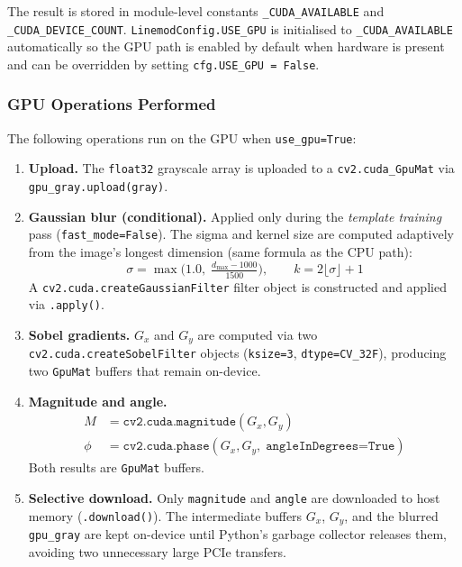 \documentclass[12pt,a4paper]{article}
\begin{document}
The result is stored in module-level constants \texttt{\_CUDA\_AVAILABLE} and
\texttt{\_CUDA\_DEVICE\_COUNT}.  \texttt{LinemodConfig.USE\_GPU} is initialised to
\texttt{\_CUDA\_AVAILABLE} automatically so the GPU path is enabled by default
when hardware is present and can be overridden by setting \texttt{cfg.USE\_GPU = False}.

\subsubsection{GPU Operations Performed}
The following operations run on the GPU when \texttt{use\_gpu=True}:

\begin{enumerate}
  \item \textbf{Upload.}  The \texttt{float32} grayscale array is uploaded to a
        \texttt{cv2.cuda\_GpuMat} via \texttt{gpu\_gray.upload(gray)}.

  \item \textbf{Gaussian blur (conditional).}  Applied only during the
        \emph{template training} pass (\texttt{fast\_mode=False}).  The sigma
        and kernel size are computed adaptively from the image's longest dimension
        (same formula as the CPU path):
        \begin{equation}
          \sigma = \max\!\bigl(1.0,\; \tfrac{d_\text{max} - 1000}{1500}\bigr),
          \qquad
          k = 2\lfloor\sigma\rfloor + 1
        \end{equation}
        A \texttt{cv2.cuda.createGaussianFilter} filter object is constructed and
        applied via \texttt{.apply()}.

  \item \textbf{Sobel gradients.}  $G_x$ and $G_y$ are computed via two
        \texttt{cv2.cuda.createSobelFilter} objects (\texttt{ksize=3},
        \texttt{dtype=CV\_32F}), producing two \texttt{GpuMat} buffers that remain
        on-device.

  \item \textbf{Magnitude and angle.}
        \begin{align}
          M   &= \texttt{cv2.cuda.magnitude}(G_x, G_y) \\
          \phi &= \texttt{cv2.cuda.phase}(G_x, G_y,\;\texttt{angleInDegrees=True})
        \end{align}
        Both results are \texttt{GpuMat} buffers.

  \item \textbf{Selective download.}  Only \texttt{magnitude} and \texttt{angle}
        are downloaded to host memory (\texttt{.download()}).  The intermediate
        buffers $G_x$, $G_y$, and the blurred \texttt{gpu\_gray} are kept on-device
        until Python's garbage collector releases them, avoiding two unnecessary
        large PCIe transfers.
\end{enumerate}
\end{document}
